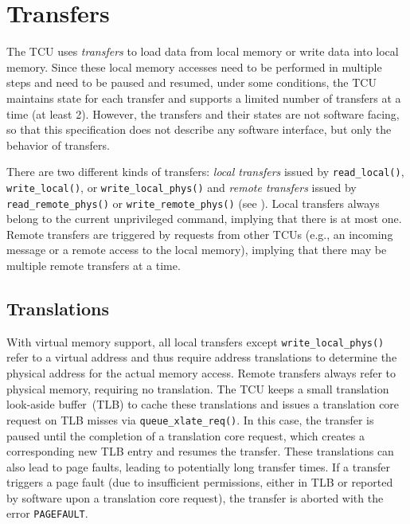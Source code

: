 \chapter{Transfers}

The TCU uses \emph{transfers} to load data from local memory or write data into local memory. Since
these local memory accesses need to be performed in multiple steps and need to be paused and
resumed\colorbox{vm}{, under some conditions,} the TCU maintains state for each transfer and
supports a limited number of transfers at a time (at least 2). However, the transfers and their
states are not software facing, so that this specification does not describe any software interface,
but only the behavior of transfers.

There are two different kinds of transfers: \emph{local transfers} issued by \texttt{read\_local()},
\texttt{write\_local()}, or \texttt{write\_local\_phys()} and \emph{remote transfers} issued by
\texttt{read\_remote\_phys()} or \texttt{write\_remote\_phys()} (see ).
Local transfers always belong to the current unprivileged command, implying that there is at most
one. Remote transfers are triggered by requests from other TCUs (e.g., an incoming message or a
remote access to the local memory), implying that there may be multiple remote transfers at a time.

\section{Translations}
\label{sec:xlates}

With virtual memory support, all local transfers except \texttt{write\_local\_phys()} refer to a
virtual address and thus require address translations to determine the physical address for the
actual memory access. Remote transfers always refer to physical memory, requiring no translation.
The TCU keeps a small translation look-aside buffer~(TLB) to cache these translations and issues a
translation core request on TLB misses via \texttt{queue\_xlate\_req()}. In this case, the transfer
is paused until the completion of a translation core request, which creates a corresponding new TLB
entry and resumes the transfer. These translations can also lead to page faults, leading to
potentially long transfer times. If a transfer triggers a page fault (due to insufficient
permissions, either in TLB or reported by software upon a translation core request), the transfer is
aborted with the error \texttt{PAGEFAULT}.

